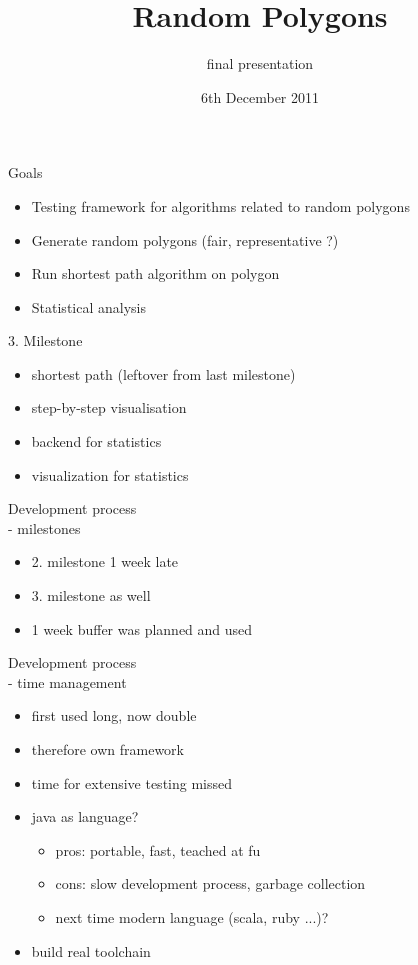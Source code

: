 \documentclass[ucs,9ptb]{beamer}
\title[Random Polygons]{Random Polygons}
\subtitle{final presentation}
\institute[FU Berlin]{Freie Universität Berlin}
\date[06.12.2011]{6th December 2011}
\begin{document}
\begin{frame}[plain]
  \titlepage
\end{frame}


\begin{frame}{Goals}
	\begin{itemize}
	\item Testing framework for algorithms related to random polygons
	\item Generate random polygons (fair, representative ?)
	\item Run shortest path algorithm on polygon
	\item Statistical analysis
	\end{itemize}
\end{frame}

\begin{frame}{3. Milestone}
  \begin{itemize}
  \item shortest path (leftover from last milestone)
  \item step-by-step visualisation
  \item backend for statistics
  \item visualization for statistics
  \end{itemize}
\end{frame}

\begin{frame}{Development process\\- milestones}
  \begin{itemize}
    \item 2. milestone 1 week late
    \item 3. milestone as well
    \item 1 week buffer was planned and used
  \end{itemize}
\end{frame}

\begin{frame}{Development process\\- time management}
  \begin{itemize}
    \item first used long, now double
    \item therefore own framework
    \item time for extensive testing missed
    \item java as language?
    \begin{itemize}
      \item pros: portable, fast, teached at fu
      \item cons: slow development process, garbage collection
      \item next time modern language (scala, ruby ...)?
    \end{itemize}
    \item build real toolchain
  \end{itemize}
\end{frame}
\end{document}
